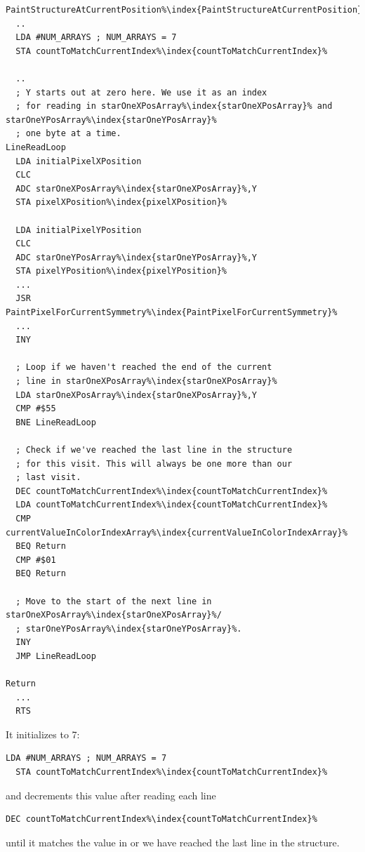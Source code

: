 \begin{lstlisting}[escapechar=\%]
PaintStructureAtCurrentPosition%\index{PaintStructureAtCurrentPosition}%   
  ..
  LDA #NUM_ARRAYS ; NUM_ARRAYS = 7
  STA countToMatchCurrentIndex%\index{countToMatchCurrentIndex}%

  ..
  ; Y starts out at zero here. We use it as an index
  ; for reading in starOneXPosArray%\index{starOneXPosArray}% and starOneYPosArray%\index{starOneYPosArray}%
  ; one byte at a time.
LineReadLoop   
  LDA initialPixelXPosition
  CLC 
  ADC starOneXPosArray%\index{starOneXPosArray}%,Y
  STA pixelXPosition%\index{pixelXPosition}%

  LDA initialPixelYPosition
  CLC 
  ADC starOneYPosArray%\index{starOneYPosArray}%,Y
  STA pixelYPosition%\index{pixelYPosition}%
  ...
  JSR PaintPixelForCurrentSymmetry%\index{PaintPixelForCurrentSymmetry}%
  ...
  INY 

  ; Loop if we haven't reached the end of the current
  ; line in starOneXPosArray%\index{starOneXPosArray}%
  LDA starOneXPosArray%\index{starOneXPosArray}%,Y
  CMP #$55
  BNE LineReadLoop

  ; Check if we've reached the last line in the structure
  ; for this visit. This will always be one more than our 
  ; last visit.
  DEC countToMatchCurrentIndex%\index{countToMatchCurrentIndex}%
  LDA countToMatchCurrentIndex%\index{countToMatchCurrentIndex}%
  CMP currentValueInColorIndexArray%\index{currentValueInColorIndexArray}%
  BEQ Return
  CMP #$01
  BEQ Return

  ; Move to the start of the next line in starOneXPosArray%\index{starOneXPosArray}%/
  ; starOneYPosArray%\index{starOneYPosArray}%.
  INY 
  JMP LineReadLoop

Return   
  ...
  RTS 
\end{lstlisting}

It initializes  to 7:
\begin{lstlisting}[escapechar=\%]
  LDA #NUM_ARRAYS ; NUM_ARRAYS = 7
  STA countToMatchCurrentIndex%\index{countToMatchCurrentIndex}%
\end{lstlisting}

and decrements this value after reading each line 
\begin{lstlisting}[escapechar=\%]
  DEC countToMatchCurrentIndex%\index{countToMatchCurrentIndex}%
\end{lstlisting}

until it matches the value in  or we have reached the last line in the structure.

